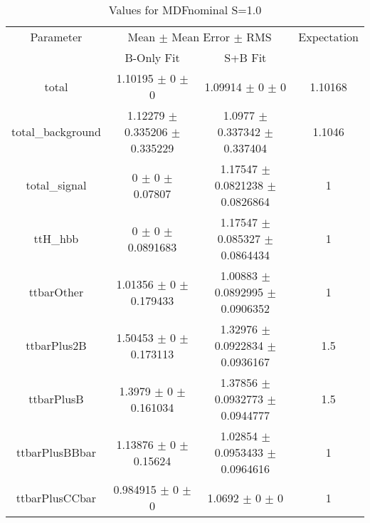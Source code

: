 \begin{table}
\centering
\caption{Values for MDFnominal S=1.0}
\begin{tabular}{cccc}
\toprule
Parameter & \multicolumn{2}{c}{Mean $\pm$ Mean Error $\pm$ RMS} & Expectation\\
 & B-Only Fit & S+B Fit & \\
\midrule
total & \num{1.10195} $\pm$ \num{0} $\pm$ \num{0} & \num{1.09914} $\pm$ \num{0} $\pm$ \num{0} & \num{1.10168}\\
total\_background & \num{1.12279} $\pm$ \num{0.335206} $\pm$ \num{0.335229} & \num{1.0977} $\pm$ \num{0.337342} $\pm$ \num{0.337404} & \num{1.1046}\\
total\_signal & \num{0} $\pm$ \num{0} $\pm$ \num{0.07807} & \num{1.17547} $\pm$ \num{0.0821238} $\pm$ \num{0.0826864} & \num{1}\\
ttH\_hbb & \num{0} $\pm$ \num{0} $\pm$ \num{0.0891683} & \num{1.17547} $\pm$ \num{0.085327} $\pm$ \num{0.0864434} & \num{1}\\
ttbarOther & \num{1.01356} $\pm$ \num{0} $\pm$ \num{0.179433} & \num{1.00883} $\pm$ \num{0.0892995} $\pm$ \num{0.0906352} & \num{1}\\
ttbarPlus2B & \num{1.50453} $\pm$ \num{0} $\pm$ \num{0.173113} & \num{1.32976} $\pm$ \num{0.0922834} $\pm$ \num{0.0936167} & \num{1.5}\\
ttbarPlusB & \num{1.3979} $\pm$ \num{0} $\pm$ \num{0.161034} & \num{1.37856} $\pm$ \num{0.0932773} $\pm$ \num{0.0944777} & \num{1.5}\\
ttbarPlusBBbar & \num{1.13876} $\pm$ \num{0} $\pm$ \num{0.15624} & \num{1.02854} $\pm$ \num{0.0953433} $\pm$ \num{0.0964616} & \num{1}\\
ttbarPlusCCbar & \num{0.984915} $\pm$ \num{0} $\pm$ \num{0} & \num{1.0692} $\pm$ \num{0} $\pm$ \num{0} & \num{1}\\
\bottomrule
\end{tabular}
\end{table}